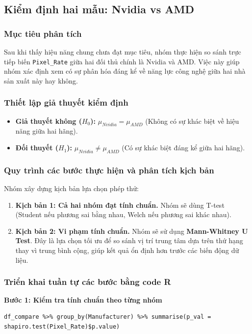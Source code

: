 \subsection{Kiểm định hai mẫu: Nvidia vs AMD}

\subsubsection{Mục tiêu phân tích}
Sau khi thấy hiệu năng chung chưa đạt mục tiêu, nhóm thực hiện so sánh trực tiếp biến \texttt{Pixel\_Rate} giữa hai đối thủ chính là Nvidia và AMD. Việc này giúp nhóm xác định xem có sự phân hóa đáng kể về năng lực công nghệ giữa hai nhà sản xuất này hay không.

\subsubsection{Thiết lập giả thuyết kiểm định}
\begin{itemize}
    \item \textbf{Giả thuyết không ($H_0$):} $\mu_{Nvidia} = \mu_{AMD}$ (Không có sự khác biệt về hiệu năng giữa hai hãng).
    \item \textbf{Đối thuyết ($H_1$):} $\mu_{Nvidia} \neq \mu_{AMD}$ (Có sự khác biệt đáng kể giữa hai hãng).
\end{itemize}

\subsubsection{Quy trình các bước thực hiện và phân tích kịch bản}
Nhóm xây dựng kịch bản lựa chọn phép thử:
\begin{enumerate}
    \item \textbf{Kịch bản 1: Cả hai nhóm đạt tính chuẩn.} Nhóm sẽ dùng T-test (Student nếu phương sai bằng nhau, Welch nếu phương sai khác nhau).
    \item \textbf{Kịch bản 2: Vi phạm tính chuẩn.} Nhóm sẽ sử dụng \textbf{Mann-Whitney U Test}. Đây là lựa chọn tối ưu để so sánh vị trí trung tâm dựa trên thứ hạng thay vì trung bình cộng, giúp kết quả ổn định hơn trước các biến động dữ liệu.
\end{enumerate}

\subsubsection{Triển khai tuần tự các bước bằng code R}
\textbf{Bước 1: Kiểm tra tính chuẩn theo từng nhóm}
\begin{lstlisting}
df_compare %>% group_by(Manufacturer) %>% summarise(p_val = shapiro.test(Pixel_Rate)$p.value)
\end{lstlisting}

